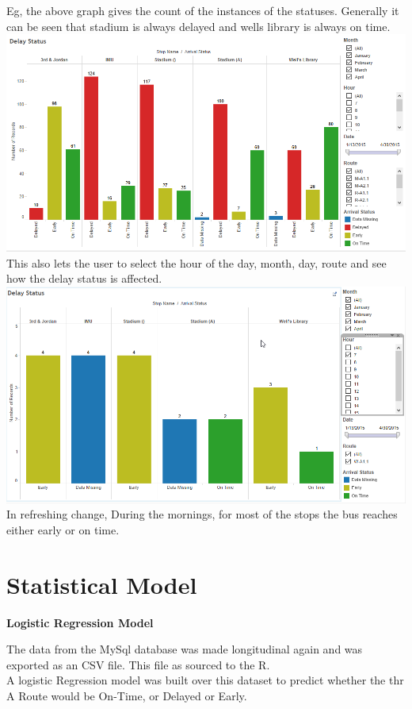 \documentclass[12pt]{article}\usepackage[]{graphicx}\usepackage[]{color}
\begin{document}
Eg, the above graph gives the count of the instances of the statuses. Generally it can be seen that stadium is always delayed and wells library is always on time.\\
\includegraphics[scale=0.55]{resources/tableau2}\\[1cm] 
This also lets the user to select the hour of the day, month, day, route and see how the delay status is affected.\\
\includegraphics[scale=0.55]{resources/tableau3}\\[1cm] 
In refreshing change, During the mornings, for most of the stops the bus reaches either early or on time.
\section{Statistical Model}
\textbf{Logistic Regression Model}

The data from the MySql database was made longitudinal again and was exported as an CSV file. This file as sourced to the R.\\

A logistic Regression model was built over this dataset to predict whether the thr A Route would be On-Time, or Delayed or Early.\\
\end{document}
